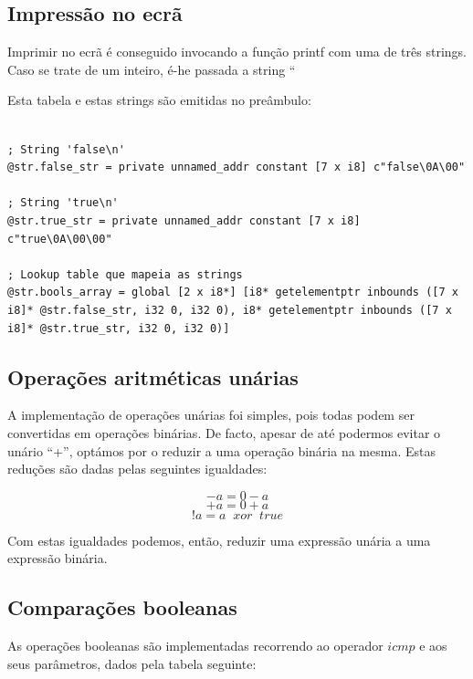 \documentclass[11pt,a4paper]{article}
\begin{document}
\subsection{Impressão no ecrã}

Imprimir no ecrã é conseguido invocando a função printf com uma de três strings. Caso se trate de um inteiro, é-he passada a string ``%

Esta tabela e estas strings são emitidas no preâmbulo:

\begin{lstlisting}

; String 'false\n'
@str.false_str = private unnamed_addr constant [7 x i8] c"false\0A\00"

; String 'true\n'
@str.true_str = private unnamed_addr constant [7 x i8] c"true\0A\00\00"

; Lookup table que mapeia as strings
@str.bools_array = global [2 x i8*] [i8* getelementptr inbounds ([7 x i8]* @str.false_str, i32 0, i32 0), i8* getelementptr inbounds ([7 x i8]* @str.true_str, i32 0, i32 0)]
\end{lstlisting}

\subsection{Operações aritméticas unárias}

A implementação de operações unárias foi simples, pois todas podem ser convertidas em operações binárias. De facto, apesar de até podermos evitar o unário ``+'', optámos por o reduzir a uma operação binária na mesma. Estas reduções são dadas pelas seguintes igualdades:

$$
-a = 0 - a
$$
$$
+a = 0 + a
$$
$$
!a = a\;\; xor\;\; true
$$

Com estas igualdades podemos, então, reduzir uma expressão unária a uma expressão binária.

\subsection{Comparações booleanas}

As operações booleanas são implementadas recorrendo ao operador $icmp$ e aos seus parâmetros, dados pela tabela seguinte:
\end{document}
